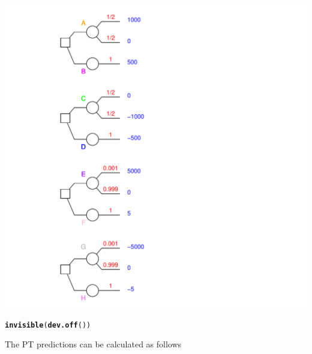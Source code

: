 \documentclass{article}\usepackage[]{graphicx}\usepackage[]{color}
\makeatletter
\newcommand{\hlstd}[1]{\textcolor[rgb]{0.345,0.345,0.345}{#1}}%
\newcommand{\hlkwd}[1]{\textcolor[rgb]{0.737,0.353,0.396}{\textbf{#1}}}%
\newenvironment{kframe}{%
 \def\at@end@of@kframe{}%
 \ifinner\ifhmode%
  \def\at@end@of@kframe{\end{minipage}}%
  \begin{minipage}{\columnwidth}%
 \fi\fi%
 \def\FrameCommand##1{\hskip\@totalleftmargin \hskip-\fboxsep
 \colorbox{shadecolor}{##1}\hskip-\fboxsep
     \hskip-\linewidth \hskip-\@totalleftmargin \hskip\columnwidth}%
 \MakeFramed {\advance\hsize-\width
   \@totalleftmargin\z@ \linewidth\hsize
   \@setminipage}}%
 {\par\unskip\endMakeFramed%
 \at@end@of@kframe}
\newenvironment{knitrout}{}{} %
\makeatother
\begin{document}
\begin{knitrout}
{\centering \includegraphics[width=0.8\linewidth]{figure/unnamed-chunk-31} 

}


\begin{kframe}\begin{alltt}
\hlkwd{invisible}\hlstd{(}\hlkwd{dev.off}\hlstd{())}
\end{alltt}
\end{kframe}
\end{knitrout}


The PT predictions can be calculated as follows
\end{document}
